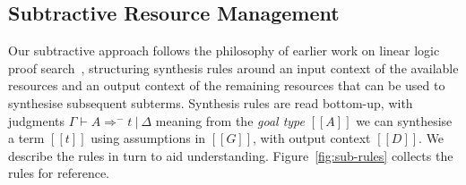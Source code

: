 \subsection{Subtractive Resource Management}
\label{subsec:subtractive}
  Our subtractive approach follows the philosophy of earlier work on
  linear logic proof search~\cite{HODAS1994327,CERVESATO2000133},
  structuring synthesis rules around an input context of the available
  resources and an output context of the remaining resources that
  can be used to synthesise subsequent subterms. Synthesis rules
  are read bottom-up, with judgments $\Gamma \vdash A \Rightarrow^{-} t\ |\ \Delta$
  meaning from the \emph{goal type} $[[A]]$ we can synthesise a term $[[t]]$ using
  assumptions in $[[G]]$, with output context $[[D]]$. We describe
  the rules in turn to aid understanding. Figure~\ref{fig:sub-rules} collects the
  rules for reference.
